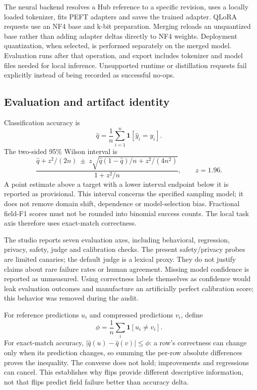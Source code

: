 \documentclass[11pt,a4paper]{article}
\begin{document}
The neural backend resolves a Hub reference to a specific revision, uses a
locally loaded tokenizer, fits PEFT adapters and saves the trained adapter.
QLoRA requests use an NF4 base and k-bit preparation. Merging reloads an
unquantized base rather than adding adapter deltas directly to NF4 weights.
Deployment quantization, when selected, is performed separately on the merged
model. Evaluation runs after that operation, and export includes tokenizer and
model files needed for local inference. Unsupported runtime or distillation
requests fail explicitly instead of being recorded as successful no-ops.

\subsection{Evaluation and artifact identity}
Classification accuracy is
\begin{equation}
\hat q=\frac{1}{n}\sum_{i=1}^n\mathbf{1}[\hat y_i=y_i].
\end{equation}
The two-sided 95\% Wilson interval is
\begin{equation}
\frac{\hat q+z^2/(2n)\ \pm\ z\sqrt{\hat q(1-\hat q)/n+z^2/(4n^2)}}
{1+z^2/n},\qquad z=1.96.
\end{equation}
A point estimate above a target with a lower interval endpoint below it is
reported as provisional. This interval concerns the specified sampling model;
it does not remove domain shift, dependence or model-selection bias. Fractional
field-F1 scores must not be rounded into binomial success counts. The local
task axis therefore uses exact-match correctness.

The studio reports seven evaluation axes, including behavioral, regression,
privacy, safety, judge and calibration checks. The present safety/privacy probes
are limited canaries; the default judge is a lexical proxy. They do not justify
claims about rare failure rates or human agreement. Missing model confidence is
reported as unmeasured. Using correctness labels themselves as confidence would
leak evaluation outcomes and manufacture an artificially perfect calibration
score; this behavior was removed during the audit.

For reference predictions $u_i$ and compressed predictions $v_i$, define
\begin{equation}
\phi=\frac{1}{n}\sum_i\mathbf{1}[u_i\ne v_i].
\end{equation}
For exact-match accuracy, $|\hat q(u)-\hat q(v)|\leq\phi$: a row's correctness
can change only when its prediction changes, so summing the per-row absolute
differences proves the inequality. The converse does not hold; improvements and
regressions can cancel. This establishes why flips provide different descriptive
information, not that flips predict field failure better than accuracy delta.
\end{document}
